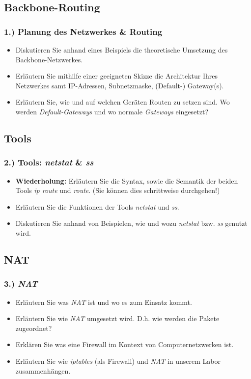 \documentclass[xcolor=dvipsnames, aspectratio=169]{beamer}
\begin{document}
\subsection{Backbone-Routing}
\begin{frame}
\frametitle{1.) Planung des Netzwerkes \& Routing}
	\begin{itemize}
		\item Diskutieren Sie anhand eines Beispiels die theoretische Umsetzung des Backbone-Netzwerkes.
		\item Erläutern Sie mithilfe einer geeigneten Skizze die Architektur Ihres Netzwerkes  samt IP-Adressen, Subnetzmaske, (Default-) Gateway(s).
		\item Erläutern Sie, wie und auf welchen Geräten Routen zu setzen sind. Wo werden \emph{Default-Gateways} und wo normale \emph{Gateways} eingesetzt?
	\end{itemize}
\end{frame}

\subsection{Tools}
\begin{frame}
	\frametitle{2.) Tools: \emph{netstat} \& \emph{ss}}
	\begin{itemize}
		\item \textbf{Wiederholung:} Erläutern Sie die Syntax, sowie die Semantik der beiden Tools \emph{ip route} und \emph{route}. (Sie können dies schrittweise durchgehen!)
		\item Erläutern Sie die Funktionen der Tools \emph{netstat} und \emph{ss}.
		\item Diskutieren Sie anhand von Beispielen, wie und wozu \emph{netstat} bzw. \emph{ss} genutzt wird.
	\end{itemize}
\end{frame}

\subsection{NAT}
\begin{frame}
	\frametitle{3.) \emph{NAT}}
	\begin{itemize}
		\item Erläutern Sie was \emph{NAT} ist und wo es zum Einsatz kommt.
		\item Erläutern Sie wie \emph{NAT} umgesetzt wird. D.h. wie werden die Pakete zugeordnet?
		\item Erklären Sie was eine Firewall im Kontext von Computernetzwerken ist.
		\item Erläutern Sie wie \emph{iptables} (als Firewall) und \emph{NAT} in unserem Labor zusammenhängen. 
	\end{itemize}
\end{frame}
\end{document}
